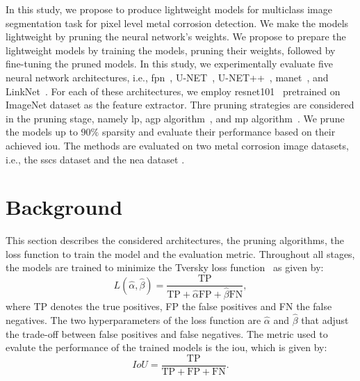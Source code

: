 \documentclass[mathematics,article,submit,pdftex,moreauthors]{Definitions/mdpi}
\begin{document}
In this study, we propose to produce lightweight
models for multiclass image segmentation
task for pixel level metal corrosion detection.
We make the models lightweight by pruning the neural 
network's weights. We propose to prepare the lightweight models
by training the models, pruning their weights, followed
by fine-tuning the pruned models. 
In this study,
we experimentally evaluate five neural network
architectures, i.e., \ac{fpn}~\cite{Lin2017}, U-NET~\cite{Ronneberger2015},
U-NET++~\cite{Zhou2018}, \ac{manet}~\cite{Fan2020}, and 
LinkNet~\cite{Chaurasia2017}. For each of these architectures,
we employ \ac{resnet101}~\cite{He2016} pretrained on ImageNet
dataset as the feature extractor. Thre pruning strategies
are considered in the pruning stage, namely
\ac{lp}, \ac{agp} algorithm~\cite{Han2017},
and \ac{mp} algorithm~\cite{Sanh2020}. We prune
the models up to $90\%$ sparsity and 
evaluate their performance based on their
achieved \ac{iou}. The methods
are evaluated on two metal corrosion image datasets,
i.e., the \ac{sscs} dataset \cite{Bianchi2021Dataset,Bianchi2022Journal} and 
the \ac{nea} dataset \cite{Liu2023}. 

\section{Background}
This section describes the considered architectures,
the pruning algorithms, the loss function
to train the model and the evaluation metric.
Throughout all stages, the models are trained to minimize
the Tversky loss function~\cite{Salehi2017} as given
by:
\begin{equation}
    L(\hat{\alpha}, \hat{\beta}) = \frac{\text{TP}}{\text{TP}+
    \hat{\alpha}\text{FP} +  \hat{\beta}\text{FN}},
\end{equation}
where TP denotes the true positives, FP the false positives
and FN the false negatives. The two hyperparameters of 
the loss function are $\hat{\alpha}$ and $\hat{\beta}$
that adjust the trade-off between false positives and
false negatives. The metric used to evalute the performance of the trained
models is the \ac{iou}, which is given by:
\begin{equation}
    IoU = \frac{\text{TP}}{\text{TP}+\text{FP}+\text{FN}}.
\end{equation}
\end{document}
